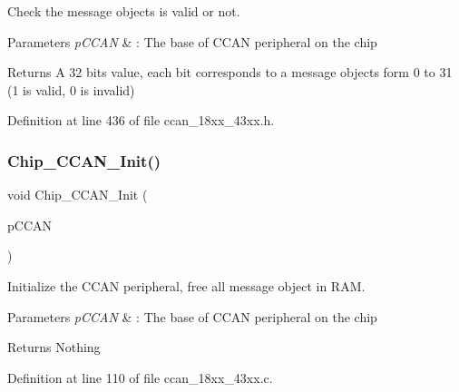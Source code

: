Check the message objects is valid or not. 


\begin{DoxyParams}{Parameters}
{\em p\+C\+C\+AN} & \+: The base of C\+C\+AN peripheral on the chip \\
\hline
\end{DoxyParams}
\begin{DoxyReturn}{Returns}
A 32 bits value, each bit corresponds to a message objects form 0 to 31 (1 is valid, 0 is invalid) 
\end{DoxyReturn}


Definition at line 436 of file ccan\+\_\+18xx\+\_\+43xx.\+h.

\mbox{\label{group___c_c_a_n__18_x_x__43_x_x_ga8525e3ffe5b5b3f1cccd4ef0823db123}} 
\subsubsection{\texorpdfstring{Chip\+\_\+\+C\+C\+A\+N\+\_\+\+Init()}{Chip\_CCAN\_Init()}}
{\footnotesize\ttfamily void Chip\+\_\+\+C\+C\+A\+N\+\_\+\+Init (\begin{DoxyParamCaption}\item[{\hyperlink{struct_l_p_c___c_c_a_n___t}{L\+P\+C\+\_\+\+C\+C\+A\+N\+\_\+T} $\ast$}]{p\+C\+C\+AN }\end{DoxyParamCaption})}



Initialize the C\+C\+AN peripheral, free all message object in R\+AM. 


\begin{DoxyParams}{Parameters}
{\em p\+C\+C\+AN} & \+: The base of C\+C\+AN peripheral on the chip \\
\hline
\end{DoxyParams}
\begin{DoxyReturn}{Returns}
Nothing 
\end{DoxyReturn}


Definition at line 110 of file ccan\+\_\+18xx\+\_\+43xx.\+c.

\mbox{\label{group___c_c_a_n__18_x_x__43_x_x_ga80123249d183199b1bff05316f6b6c32}} 

